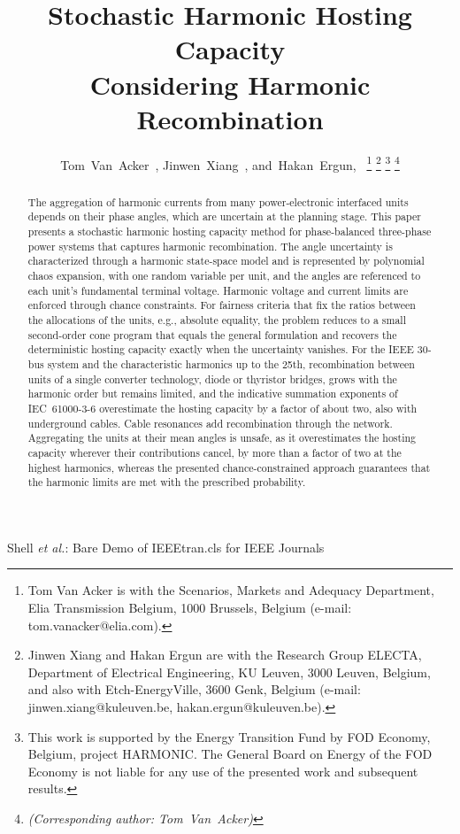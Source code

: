 \documentclass[journal]{IEEEtran}
\begin{document}
\title{Stochastic Harmonic Hosting Capacity \\ Considering Harmonic Recombination}
\author{Tom~Van~Acker~,%
        Jinwen~Xiang~,%
        and~Hakan~Ergun,~%
\thanks{Tom Van Acker is with the Scenarios, Markets and Adequacy Department, Elia Transmission Belgium, 1000 Brussels, Belgium (e-mail: tom.vanacker@elia.com).}%
\thanks{Jinwen Xiang and Hakan Ergun are with the Research Group ELECTA, Department of Electrical Engineering, KU Leuven, 3000 Leuven, Belgium, and also with Etch-EnergyVille, 3600 Genk, Belgium (e-mail: jinwen.xiang@kuleuven.be, hakan.ergun@kuleuven.be).}
\thanks{This work is supported by the Energy Transition Fund by FOD Economy, Belgium, project HARMONIC. The General Board on Energy of the FOD Economy is not liable for any use of the presented work and subsequent results.}
\thanks{\textit{(Corresponding author: Tom~Van~Acker)}}}

%
{Shell \MakeLowercase{\textit{et al.}}: Bare Demo of IEEEtran.cls for IEEE Journals}

\maketitle

\begin{abstract}
The aggregation of harmonic currents from many power-electronic interfaced units depends on their phase angles, which are uncertain at the planning stage. This paper presents a stochastic harmonic hosting capacity method for phase-balanced three-phase power systems that captures harmonic recombination. The angle uncertainty is characterized through a harmonic state-space model and is represented by polynomial chaos expansion, with one random variable per unit, and the angles are referenced to each unit's fundamental terminal voltage. Harmonic voltage and current limits are enforced through chance constraints. For fairness criteria that fix the ratios between the allocations of the units, e.g., absolute equality, the problem reduces to a small second-order cone program that equals the general formulation and recovers the deterministic hosting capacity exactly when the uncertainty vanishes. For the IEEE 30-bus system and the characteristic harmonics up to the 25th, recombination between units of a single converter technology, diode or thyristor bridges, grows with the harmonic order but remains limited, and the indicative summation exponents of IEC~61000-3-6 overestimate the hosting capacity by a factor of about two, also with underground cables. Cable resonances add recombination through the network. Aggregating the units at their mean angles is unsafe, as it overestimates the hosting capacity wherever their contributions cancel, by more than a factor of two at the highest harmonics, whereas the presented chance-constrained approach guarantees that the harmonic limits are met with the prescribed probability.
\end{abstract}
\end{document}
